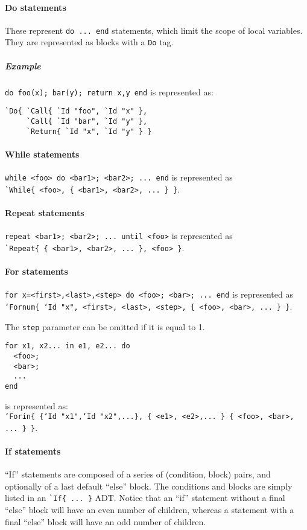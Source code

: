 \paragraph{Do statements}
These represent \verb|do ... end| statements, which limit the scope of
local variables. They are represented as blocks with a \verb|Do| tag.

\subparagraph{Example}
\verb|do foo(x); bar(y); return x,y end| is represented as:
\begin{verbatim}
`Do{ `Call{ `Id "foo", `Id "x" },
     `Call{ `Id "bar", `Id "y" },
     `Return{ `Id "x", `Id "y" } }
\end{verbatim}

\paragraph{While statements}
\verb|while <foo> do <bar1>; <bar2>; ... end| is represented as \\
\verb|`While{ <foo>, { <bar1>, <bar2>, ... } }|.

\paragraph{Repeat statements}
\verb|repeat <bar1>; <bar2>; ... until <foo>| is represented as \\
\verb|`Repeat{ { <bar1>, <bar2>, ... }, <foo> }|.

\paragraph{For statements}

{\tt for x=<first>,<last>,<step> do <foo>; <bar>; ... end} is
represented as {\tt `Fornum\{ `Id "x", <first>, <last>, <step>, \{
  <foo>, <bar>, ... \} \}}.

The \verb|step| parameter can be omitted if it is equal to 1.

\begin{verbatim}
for x1, x2... in e1, e2... do
  <foo>;
  <bar>;
  ...
end
\end{verbatim}
is represented as:\\
{\tt `Forin\{ \{`Id "x1",`Id "x2",...\}, \{ <e1>, <e2>,... \} \{
 <foo>, <bar>, ... \} \}}.

\paragraph{If statements}
``If'' statements are composed of a series of (condition, block)
pairs, and optionally of a last default ``else'' block. The conditions
and blocks are simply listed in an \verb|`If{ ... }| ADT. Notice that
an ``if'' statement without a final ``else'' block will have an even
number of children, whereas a statement with a final ``else'' block
will have an odd number of children.

